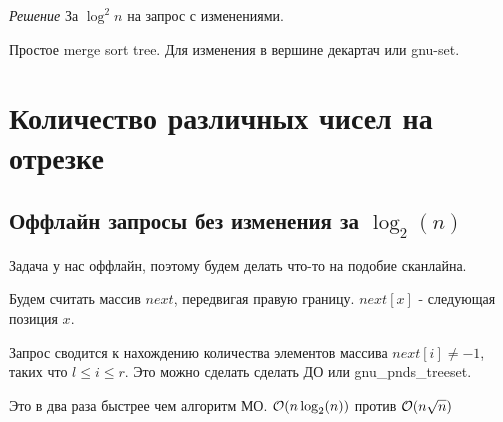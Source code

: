 {\it Решение } За $\log^2 n$ на запрос с изменениями.

Простое merge sort tree. Для изменения в вершине декартач или gnu-set.

\section{Количество различных чисел на отрезке}
\subsection{Оффлайн запросы без изменения за $\log_2(n)$}

Задача у нас оффлайн, поэтому будем делать что-то на подобие сканлайна.

Будем считать массив $next$, передвигая правую границу. $next[x]$ - следующая позиция $x$.

Запрос сводится к нахождению количества элементов массива $next[i] \ne -1$, таких что $l \le i \le r$. Это можно сделать сделать ДО или gnu\_pnds\_treeset.

Это в два раза быстрее чем алгоритм МО. $ \mathcal{O}(n \log_2(n))$ против $ \mathcal{O}(n \sqrt n)$

